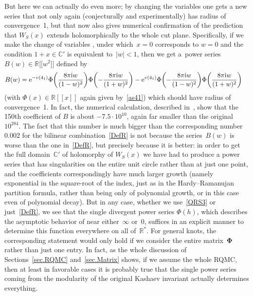 \documentclass[pdftex]{sigma}
\numberwithin{equation}{section}
\def\BR{\mathbb R}
\def\BC{\mathbb C}
\def\R{\mathbb R}
\def\s{\sigma}
\def\bPhi{\mathbf\Phi}
\begin{document}
But here we can actually do even more; by changing the variables one gets a new series
that not only again (conjecturally and experimentally) has radius of convergence~1,
but that now also gives numerical confirmation of the prediction that $W_S(x)$ extends
holomorphically to the whole cut plane. Specifically, if we make the change of variables
, under which~${x=0}$ corresponds to $w=0$ and
the condition $1+x\in\BC'$ is equivalent to~$|w|<1$, then we get a~power series
$B(w)\in\BR\big[\big[w^2\big]\big]$ defined by
\begin{align}
\label{QRS3}
B(w) &=
{\rm e}^{-v(4_1)} \Phi\biggl(\frac{8 \pi{\rm i} w}{(1-w)^2}\biggr)
\Phi\biggl(-\frac{8 \pi{\rm i} w}{(1+w)^2}\biggr)
 -
{\rm e}^{v(4_1)} \Phi\biggl(-\frac{8 \pi{\rm i} w}{(1-w)^2}\biggr)
\Phi\biggl(\frac{8 \pi{\rm i} w}{(1+w)^2}\biggr)
\end{align}
(with $\Phi(x)\in\BR[[x]]$ again given by~\eqref{as41}) which should have radius
of convergence~1. In fact, the numerical calculation, described in~\cite{GZ:qseries},
show that the 150th coefficient of $B$ is about $-7.5 \cdot 10^{10}$, again far
smaller than the original~$10^{284}$. The fact that this number is much bigger than
the corresponding number~$0.002$ for the bilinear combination~\eqref{DefR} is not
because the series~$B(w)$ is worse than the one in~\eqref{DefR}, but precisely because
it is better: in order to get the full domain~$\BC'$ of holomorphy of $W_S(x)$ we have
had to produce a power series that has singularities on the entire unit circle rather
than at just one point, and the coefficients correspondingly have much larger growth
(namely exponential in the square-root of the index, just as in the Hardy--Ramanujan
partition formula, rather than being only of polynomial growth, or in this case even
of polynomial decay). But in any case, whether we use~\eqref{QRS3} or just~\eqref{DefR},
we see that the single divergent power series $\Phi(h)$, which describes the asymptotic
behavior of \smash{$W_S^{(4_1,\s_1,\s_1)}(x)$} near either~$\infty$ or~0, suffices in an explicit
manner to determine this function everywhere on all of~$\R^*$. For general knots,
the corresponding statement would only hold if we consider the entire matrix~$\bPhi$
rather than just one entry. In fact, as the whole discussion of Sections~\ref{sec.RQMC}
and~\ref{sec.Matrix} shows, if we assume the whole RQMC, then at least in favorable
cases it is probably true that the single power series  coming from the
modularity of the original Kashaev invariant actually determines everything.
\end{document}
